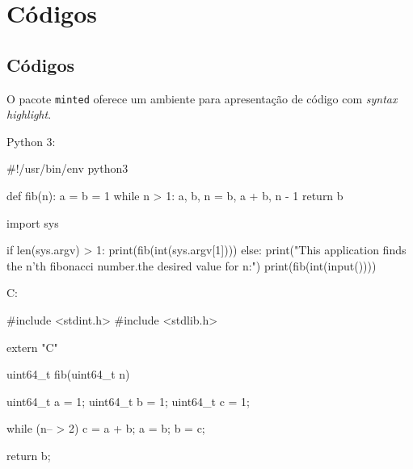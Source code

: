 
\section{Códigos}
\subsection{Códigos}

O pacote \texttt{minted} oferece um ambiente para apresentação de código com
\textit{syntax highlight}.

Python 3:

\begin{python3code}
#!/usr/bin/env python3


def fib(n):
    a = b = 1
    while n > 1:
        a, b, n = b, a + b, n - 1
    return b

import sys

if len(sys.argv) > 1:
    print(fib(int(sys.argv[1])))
else:
    print("This application finds the n'th fibonacci number.\nType the desired value for n:")
    print(fib(int(input())))
\end{python3code}

C:

\begin{ccode}
#include <stdint.h>
#include <stdlib.h>

extern "C" {
    uint64_t fib(uint64_t n)
    {
        uint64_t a = 1;
        uint64_t b = 1;
        uint64_t c = 1;

        while (n-- > 2) {
            c = a + b;
            a = b;
            b = c;
        }

        return b;
    }
}
\end{ccode}
